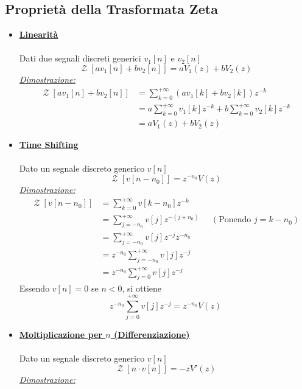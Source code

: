 \documentclass{article}
\newcommand{\Ztransf}{\mathop{\mathcal{Z}}}
\begin{document}
		\subsection{Proprietà della Trasformata Zeta}
			\begin{itemize}
				\item \underline{\textbf{Linearità}} \\
					  \\
					  Dati due segnali discreti generici $ v_1[n] \text{ e } v_2[n] $
					  \[
					  	\Ztransf[av_1[n] + bv_2[n]] = aV_1(z) + bV_2(z)
					  \]
					  \underline{\textit{Dimostrazione:}} \\
					  \[
					  	\begin{aligned}
					  		\Ztransf[av_1[n] + bv_2[n]] &= \sum_{k=0}^{+\infty} {(av_1[k] + bv_2[k])z^{-k}} \\
							&= a \sum_{k=0}^{+\infty} {v_1[k]z^{-k}} + b \sum_{k=0}^{+\infty} {v_2[k]z^{-k}} \\
							&= aV_1(z) + bV_2(z)
					  	\end{aligned}
					  \]
				\item \underline{\textbf{Time Shifting}} \\
					  \\
					  Dato un segnale discreto generico $ v[n] $
					  \[
					  	\Ztransf[v[n - n_0]] = z^{-n_0}V(z)
					  \]
					  \underline{\textit{Dimostrazione:}} \\
					  \[
					  	\begin{aligned}
					  		\Ztransf[v[n - n_0]] &= \sum_{k=0}^{+\infty} {v[k - n_0]z^{-k}} \\
							&= \sum_{j=-n_0}^{+\infty} {v[j]z^{-(j+n_0)}}\;\;\;\;\; (\text{Ponendo } j=k - n_0) \\
							&= \sum_{j=-n_0}^{+\infty} {v[j]z^{-j}z^{-n_0}} \\
							&= z^{-n_0} \sum_{j=-n_0}^{+\infty} {v[j]z^{-j}} \\
							&= z^{-n_0} \sum_{j=0}^{+\infty} {v[j]z^{-j}}
					  	\end{aligned}
					  \]
					  Essendo $ v[n] = 0 $ se $ n<0 $, si ottiene
					  \[
					  	z^{-n_0} \sum_{j=0}^{+\infty} {v[j]z^{-j}} = z^{-n_0}V(z)
					  \]
				\item \underline{\textbf{Moltiplicazione per $ n $ (Differenziazione)}} \\
					  \\
					  Dato un segnale discreto generico $ v[n] $
					  \[
					  	\Ztransf[n\cdot v[n]] = -z V'(z)
					  \]
					  \underline{\textit{Dimostrazione:}} \\

\end{itemize}
\end{document}
